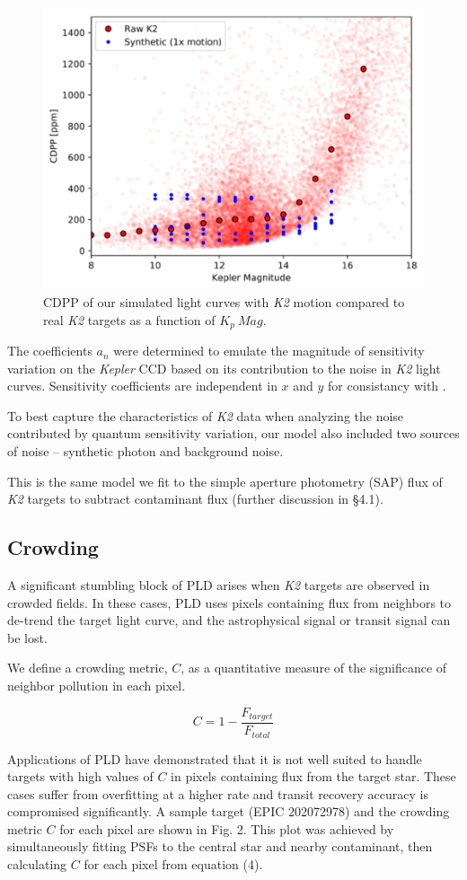 \documentclass[12pt,preprint]{aastex}
\begin{document}
\begin{figure}[h]
	\centering
	\includegraphics[width=.5\linewidth]{1xmotion.png}
	\caption{CDPP of our simulated light curves with \textit{K2} motion compared to real \textit{K2} targets as a function of $K_p\ Mag$.}
	\label{fig:1motion}
\end{figure}

The coefficients $a_n$ were determined to emulate the magnitude of sensitivity variation on the \textit{Kepler} CCD based on its contribution to the noise in \textit{K2} light curves. Sensitivity coefficients are independent in $x$ and $y$ for consistancy with \cite{toyozumi_ashley_2005}.

To best capture the characteristics of \textit{K2} data when analyzing the noise contributed by quantum sensitivity variation, our model also included two sources of noise -- synthetic photon and background noise.

This is the same model we fit to the simple aperture photometry (SAP) flux of \textit{K2} targets to subtract contaminant flux (further discussion in \S 4.1).

\subsection{Crowding}

A significant stumbling block of PLD arises when \textit{K2} targets are observed in crowded fields. In these cases, PLD uses pixels containing flux from neighbors to de-trend the target light curve, and the astrophysical signal or transit signal can be lost.

We define a crowding metric, $C$, as a quantitative measure of the significance of neighbor pollution in each pixel.

\[
\tag{4}
C = 1 - \frac{F_{target}}{F_{total}}
\]

Applications of PLD have demonstrated that it is not well suited to handle targets with high values of $C$ in pixels containing flux from the target star. These cases suffer from overfitting at a higher rate and transit recovery accuracy is compromised significantly. A sample target (EPIC 202072978) and the crowding metric $C$ for each pixel are shown in Fig. 2. This plot was achieved by simultaneously fitting PSFs to the central star and nearby contaminant, then calculating $C$ for each pixel from equation (4).
\end{document}
